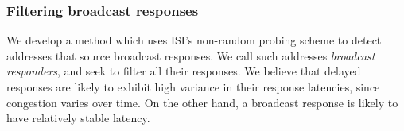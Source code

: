 %

\subsubsection*{Filtering broadcast responses}

%
We develop a method which uses ISI's non-random probing
scheme to detect addresses that source broadcast responses.
We call such addresses \emph{broadcast responders}, and seek to filter
all their responses.
%
We believe that delayed responses are likely to
exhibit high variance in their response latencies, since congestion varies over
time. 
%
On the other hand, a
broadcast response is likely to have relatively stable latency.
%

